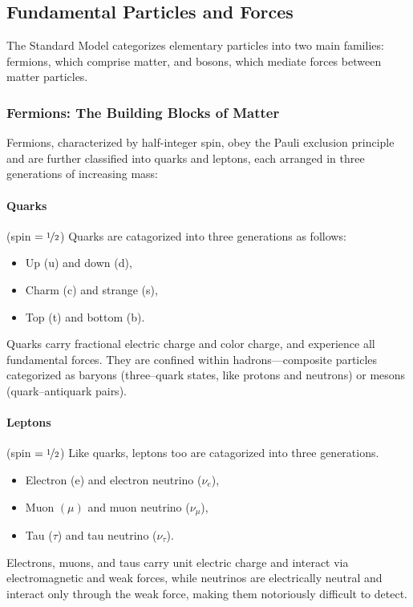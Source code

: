 \subsection{Fundamental Particles and Forces}
The Standard Model categorizes elementary particles into two main families: fermions, which comprise matter, and bosons, which mediate forces between matter particles.
\subsubsection{Fermions: The Building Blocks of Matter}
Fermions, characterized by half-integer spin, obey the Pauli exclusion principle and are further classified into quarks and leptons, each arranged in three generations of increasing mass:
\paragraph{Quarks} (spin $ = \nicefrac{1}{2}$)
Quarks are catagorized into three generations as follows:
\begin{itemize}
    \item Up (u) and down (d),
    \item Charm (c) and strange (s),
    \item Top (t) and bottom (b).
\end{itemize}

Quarks carry fractional electric charge and color charge, and experience all fundamental forces.
%
They are confined within hadrons---composite particles categorized as baryons (three--quark states, like protons and neutrons) or mesons (quark--antiquark pairs).

\paragraph{Leptons} (spin $ = \nicefrac{1}{2}$)
Like quarks, leptons too are catagorized into three generations.
\begin{itemize}
    \item Electron (e) and electron neutrino ($\nu_e$),
    \item Muon $(\mu)$ and muon neutrino ($\nu_\mu$),
    \item Tau ($\tau$) and tau neutrino ($\nu_\tau$).
\end{itemize}

Electrons, muons, and taus carry unit electric charge and interact via electromagnetic and weak forces, while neutrinos are electrically neutral and interact only through the weak force, making them notoriously difficult to detect.

